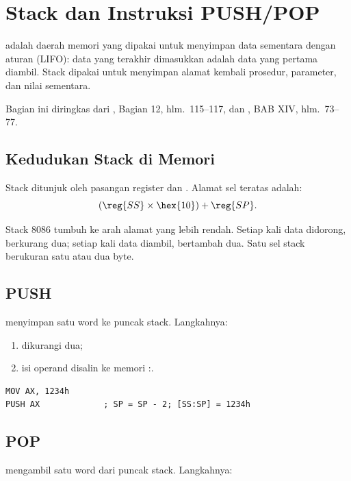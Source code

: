 \section{Stack dan Instruksi PUSH/POP}
\label{sec:stack}

 adalah daerah memori yang dipakai untuk menyimpan data
sementara dengan aturan  (LIFO): data yang
terakhir dimasukkan adalah data yang pertama diambil. Stack dipakai
untuk menyimpan alamat kembali prosedur, parameter, dan nilai
sementara.

Bagian ini diringkas dari \cite{gunawan2019}, Bagian 12,
hlm.~115--117, dan \cite{sto2001}, BAB XIV, hlm.~73--77.

\subsection{Kedudukan Stack di Memori}

Stack ditunjuk oleh pasangan register  dan . Alamat
sel teratas adalah:
\[
    (\reg{SS} \times \hex{10}) + \reg{SP}.
\]

Stack 8086 tumbuh ke arah alamat yang lebih rendah. Setiap kali data
didorong,  berkurang dua; setiap kali data diambil, 
bertambah dua. Satu sel stack berukuran satu  atau dua byte.

\subsection{PUSH}

 menyimpan satu word ke puncak stack. Langkahnya:

\begin{enumerate}
    \item {} dikurangi dua;
    \item isi operand disalin ke memori :.
\end{enumerate}

\begin{lstlisting}[language=MASM, numbers=none]
MOV AX, 1234h
PUSH AX             ; SP = SP - 2; [SS:SP] = 1234h
\end{lstlisting}

\subsection{POP}

 mengambil satu word dari puncak stack. Langkahnya:

